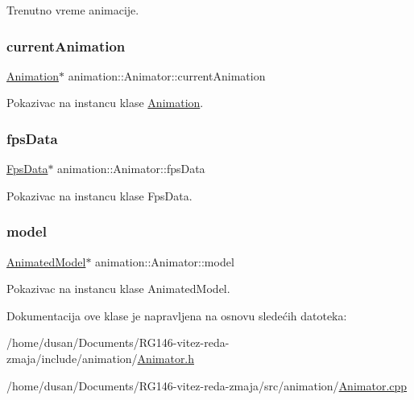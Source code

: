 Trenutno vreme animacije. 

\mbox{\label{classanimation_1_1Animator_a97342956340bc49d17161b83ce72d6d1}} 
\subsubsection{\texorpdfstring{current\+Animation}{currentAnimation}}
{\footnotesize\ttfamily \hyperlink{classanimation_1_1Animation}{Animation}$\ast$ animation\+::\+Animator\+::current\+Animation\hspace{0.3cm}{\ttfamily [private]}}



Pokazivac na instancu klase \hyperlink{classanimation_1_1Animation}{Animation}. 

\mbox{\label{classanimation_1_1Animator_a865e52c4c069f203f847fbd98b86c52a}} 
\subsubsection{\texorpdfstring{fps\+Data}{fpsData}}
{\footnotesize\ttfamily \hyperlink{classutility_1_1FpsData}{Fps\+Data}$\ast$ animation\+::\+Animator\+::fps\+Data\hspace{0.3cm}{\ttfamily [private]}}



Pokazivac na instancu klase Fps\+Data. 

\mbox{\label{classanimation_1_1Animator_a5578ef87b7bf69b4434dcf916c279714}} 
\subsubsection{\texorpdfstring{model}{model}}
{\footnotesize\ttfamily \hyperlink{classmodel_1_1AnimatedModel}{Animated\+Model}$\ast$ animation\+::\+Animator\+::model\hspace{0.3cm}{\ttfamily [private]}}



Pokazivac na instancu klase Animated\+Model. 



Dokumentacija ove klase je napravljena na osnovu sledećih datoteka\+:\begin{DoxyCompactItemize}
\item 
/home/dusan/\+Documents/\+R\+G146-\/vitez-\/reda-\/zmaja/include/animation/\hyperlink{Animator_8h}{Animator.\+h}\item 
/home/dusan/\+Documents/\+R\+G146-\/vitez-\/reda-\/zmaja/src/animation/\hyperlink{Animator_8cpp}{Animator.\+cpp}\end{DoxyCompactItemize}
